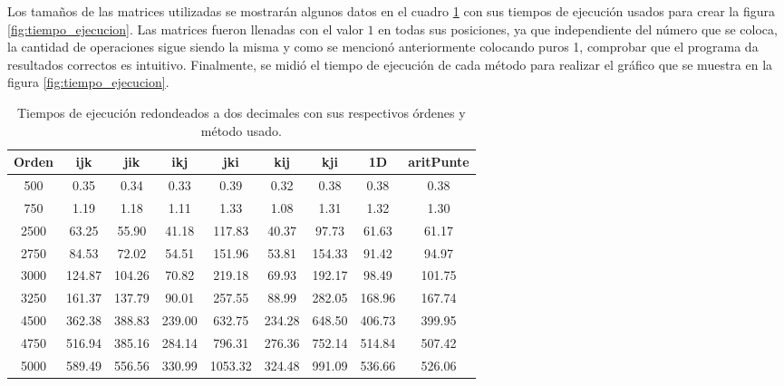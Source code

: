 \documentclass[10pt]{article}
\begin{document}
Los tamaños de las matrices utilizadas se mostrarán algunos datos en el cuadro \ref{tab:datos} con sus tiempos de ejecución usados para crear la figura \ref{fig:tiempo_ejecucion}. Las matrices fueron llenadas con el valor $1$ en todas sus posiciones, ya que independiente del número que se coloca, la cantidad de operaciones sigue siendo la misma y como se mencionó anteriormente colocando puros 1, comprobar que el programa da resultados correctos es intuitivo. Finalmente, se midió el tiempo de ejecución de cada método para realizar el gráfico que se muestra en la figura \ref{fig:tiempo_ejecucion}.

\begin{table}[h!]
\centering
\setlength{\tabcolsep}{4pt} %
\renewcommand{\arraystretch}{1.2} %
\begin{tabular}{|c|c|c|c|c|c|c|c|c|}
\hline
\textbf{Orden} & \textbf{ijk} & \textbf{jik} & \textbf{ikj} & \textbf{jki} & \textbf{kij} & \textbf{kji} & \textbf{1D} & \textbf{aritPunte} \\ \hline
500  & 0.35 & 0.34 & 0.33 & 0.39 & 0.32 & 0.38 & 0.38 & 0.38 \\ \hline
750  & 1.19 & 1.18 & 1.11 & 1.33 & 1.08 & 1.31 & 1.32 & 1.30 \\ \hline
2500 & 63.25 & 55.90 & 41.18 & 117.83 & 40.37 & 97.73 & 61.63 & 61.17 \\ \hline
2750 & 84.53 & 72.02 & 54.51 & 151.96 & 53.81 & 154.33 & 91.42 & 94.97 \\ \hline
3000 & 124.87 & 104.26 & 70.82 & 219.18 & 69.93 & 192.17 & 98.49 & 101.75 \\ \hline
3250 & 161.37 & 137.79 & 90.01 & 257.55 & 88.99 & 282.05 & 168.96 & 167.74 \\ \hline
4500 & 362.38 & 388.83 & 239.00 & 632.75 & 234.28 & 648.50 & 406.73 & 399.95 \\ \hline
4750 & 516.94 & 385.16 & 284.14 & 796.31 & 276.36 & 752.14 & 514.84 & 507.42 \\ \hline
5000 & 589.49 & 556.56 & 330.99 & 1053.32 & 324.48 & 991.09 & 536.66 & 526.06 \\ \hline
\end{tabular}
\caption{Tiempos de ejecución redondeados a dos decimales con sus respectivos órdenes y método usado.}
\label{tab:datos}
\end{table}
\end{document}
